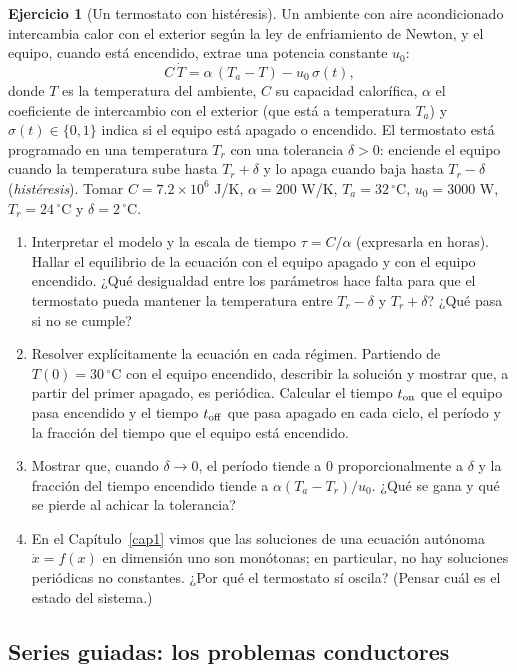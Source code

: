 \documentclass[12pt, a4paper]{amsbook}
\theoremstyle{remark}
\theoremstyle{definition}
\newtheorem{ejer}[teo]{Ejercicio}
\numberwithin{section}{chapter}
\numberwithin{subsection}{section}
\numberwithin{equation}{section}
\numberwithin{figure}{chapter}
\begin{document}
\begin{ejer}[Un termostato con histéresis]\label{ejer:termostato}
Un ambiente con aire acondicionado intercambia calor con el exterior según la ley de enfriamiento de Newton, y el equipo, cuando está encendido, extrae una potencia constante $u_0$:
$$C\,\dot T = \alpha\,(T_a - T) - u_0\,\sigma(t),$$
donde $T$ es la temperatura del ambiente, $C$ su capacidad calorífica, $\alpha$ el coeficiente de intercambio con el exterior (que está a temperatura $T_a$) y $\sigma(t)\in\{0,1\}$ indica si el equipo está apagado o encendido. El termostato está programado en una temperatura $T_r$ con una tolerancia $\delta>0$: enciende el equipo cuando la temperatura sube hasta $T_r+\delta$ y lo apaga cuando baja hasta $T_r-\delta$ (\emph{histéresis}). Tomar $C = 7.2\times10^6$ J/K, $\alpha = 200$ W/K, $T_a = 32\,^\circ$C, $u_0 = 3000$ W, $T_r=24\,^\circ$C y $\delta = 2\,^\circ$C.
\begin{enumerate}
\item Interpretar el modelo y la escala de tiempo $\tau = C/\alpha$ (expresarla en horas). Hallar el equilibrio de la ecuación con el equipo apagado y con el equipo encendido. ¿Qué desigualdad entre los parámetros hace falta para que el termostato pueda mantener la temperatura entre $T_r-\delta$ y $T_r+\delta$? ¿Qué pasa si no se cumple?
\item Resolver explícitamente la ecuación en cada régimen. Partiendo de $T(0)=30\,^\circ$C con el equipo encendido, describir la solución y mostrar que, a partir del primer apagado, es periódica. Calcular el tiempo $t_{\rm on}$ que el equipo pasa encendido y el tiempo $t_{\rm off}$ que pasa apagado en cada ciclo, el período y la fracción del tiempo que el equipo está encendido.
\item Mostrar que, cuando $\delta\to0$, el período tiende a $0$ proporcionalmente a $\delta$ y la fracción del tiempo encendido tiende a $\alpha(T_a-T_r)/u_0$. ¿Qué se gana y qué se pierde al achicar la tolerancia?
\item En el Capítulo~\ref{cap1} vimos que las soluciones de una ecuación autónoma $\dot x = f(x)$ en dimensión uno son monótonas; en particular, no hay soluciones periódicas no constantes. ¿Por qué el termostato sí oscila? (Pensar cuál es el estado del sistema.)
\end{enumerate}
\end{ejer}


\subsection*{Series guiadas: los problemas conductores}
\end{document}
